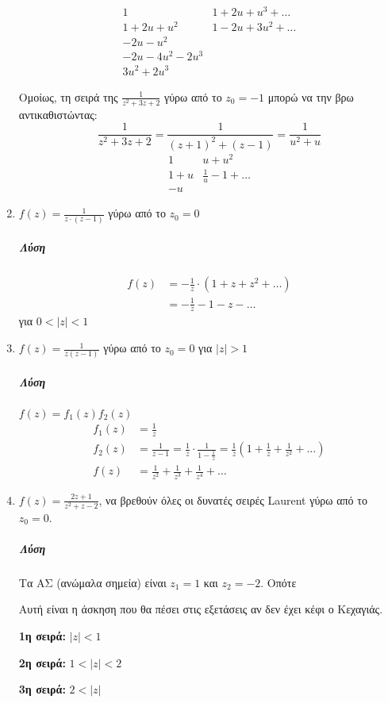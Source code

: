 \documentclass[12pt,a4paper,titlepage,fleqn]{article}
\begin{document}
\begin{enumerate}
  \[
  \begin{array}{l|l}
  1 & 1+2u+u^3 + \dots \\ \hline
  1+2u+u^2 & 1-2u+3u^2+\dots \\
  -2u-u^2 & \\ -2u-4u^2-2u^3 & \\ 3u^2+2u^3
  \end{array}
  \]
  
  Ομοίως, τη σειρά της \( \frac{1}{z^2+3z+2} \) γύρω από το \( z_0 = -1 \) μπορώ
  να την βρω αντικαθιστώντας:
  \[
  \frac{1}{z^2+3z+2} = \frac{1}{(z+1)^2+(z-1)} = \frac{1}{u^2+u}
  \]\[
  \begin{array}{l|l}
  1 & u+u^2 \\ \hline
  1+u & \frac{1}{u} - 1 + \dots \\
  -u &
  \end{array}
  \]
  
  \item \( f(z) = \frac{1}{z\cdot(z-1)} \) γύρω από το \( z_0 = 0 \)
  \subparagraph{Λύση}
  \begin{align*}
  f(z) &= -\frac{1}{z}\cdot ( 1+z+z^2+\dots) \\
  &= -\frac{1}{z} - 1 - z - \dots
  \end{align*}
  για \( 0<|z|<1 \)
  
  \item \( f(z) = \frac{1}{z(z-1)} \) γύρω από το \( z_0 = 0 \) για \( |z|>1 \)
  \subparagraph{Λύση}
  \( f(z) = f_1(z)f_2(z) \)
  \begin{align*}
  f_1(z) &= \frac{1}{z} \\
  f_2(z) &= \frac{1}{z-1} = \frac{1}{z} \cdot \frac{1}{1-\frac{1}{z}}
  = \frac{1}{z} \left(
  1+\frac{1}{z} + \frac{1}{z^2} + \dots
  \right) \\
  f(z) &= \frac{1}{z^2} + \frac{1}{z^3} + \frac{1}{z^4} + \dots
  \end{align*}
  
  \item \( f(z) = \frac{2z+1}{z^2+z-2} \), να βρεθούν όλες οι δυνατές σειρές Laurent γύρω
  από το \( z_0 = 0 \).
  \subparagraph{Λύση} Τα ΑΣ (ανώμαλα σημεία) είναι \( z_1 = 1 \) και \( z_2 = -2 \).
  Οπότε %
  
  Αυτή είναι η άσκηση που θα πέσει στις εξετάσεις αν δεν έχει κέφι ο Κεχαγιάς.
  
  \textbf{1η σειρά:} \( |z|<1 \)
  
  \textbf{2η σειρά:} \( 1<|z|<2 \)
  
  \textbf{3η σειρά:} \( 2<|z| \)
  

\end{enumerate}
\end{document}
